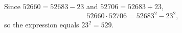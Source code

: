 Since $52660=52683-23$ and $52706=52683+23$,
\[
52660\cdot52706=52683^2-23^2 ,
\]
so the expression equals $23^2=\boxed{529}$.
